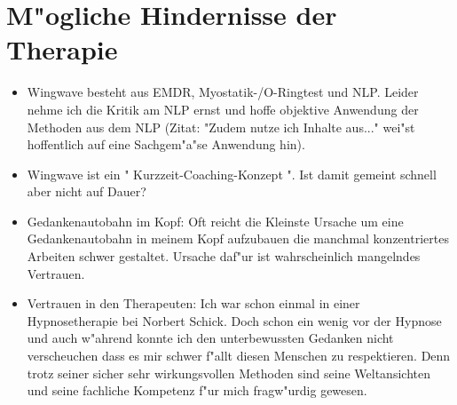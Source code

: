 \documentclass[11pt,a4paper,german]{article}
\begin{document}
\section{M"ogliche Hindernisse der Therapie}
\begin{itemize}
	\item Wingwave besteht aus EMDR, Myostatik-/O-Ringtest und NLP. Leider nehme ich die Kritik am NLP ernst und hoffe objektive Anwendung der Methoden aus dem NLP (Zitat: "{}Zudem nutze ich Inhalte aus..."{} wei"st hoffentlich auf eine Sachgem"a"se Anwendung hin).
	\item Wingwave ist ein "{} Kurzzeit-Coaching-Konzept "{}. Ist damit gemeint schnell aber nicht auf Dauer?
	\item Gedankenautobahn im Kopf: Oft reicht die Kleinste Ursache um eine Gedankenautobahn in meinem Kopf aufzubauen die manchmal konzentriertes Arbeiten schwer gestaltet. Ursache daf"ur ist wahrscheinlich mangelndes Vertrauen.
	\item Vertrauen in den Therapeuten: Ich war schon einmal in einer Hypnosetherapie bei Norbert Schick. Doch schon ein wenig vor der Hypnose und auch w"ahrend konnte ich den unterbewussten Gedanken nicht verscheuchen dass es mir schwer f"allt diesen Menschen zu respektieren. Denn trotz seiner sicher sehr wirkungsvollen Methoden sind seine Weltansichten und seine fachliche Kompetenz f"ur mich fragw"urdig gewesen.
\end{itemize}
\end{document}
